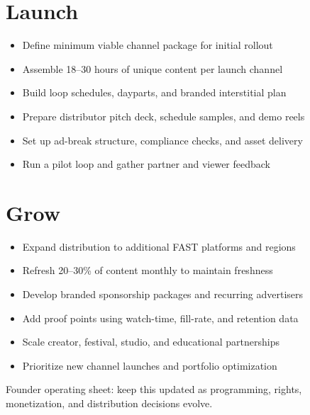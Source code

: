 \documentclass[10pt]{article}
\newcommand{\checkitem}[1]{\item[$\square$] #1}
\begin{document}
\begin{minipage}[t]{0.49\textwidth}
\section*{Launch}
\begin{itemize}
    \checkitem{Define minimum viable channel package for initial rollout}
    \checkitem{Assemble 18--30 hours of unique content per launch channel}
    \checkitem{Build loop schedules, dayparts, and branded interstitial plan}
    \checkitem{Prepare distributor pitch deck, schedule samples, and demo reels}
    \checkitem{Set up ad-break structure, compliance checks, and asset delivery}
    \checkitem{Run a pilot loop and gather partner and viewer feedback}
\end{itemize}

\section*{Grow}
\begin{itemize}
    \checkitem{Expand distribution to additional FAST platforms and regions}
    \checkitem{Refresh 20--30\% of content monthly to maintain freshness}
    \checkitem{Develop branded sponsorship packages and recurring advertisers}
    \checkitem{Add proof points using watch-time, fill-rate, and retention data}
    \checkitem{Scale creator, festival, studio, and educational partnerships}
    \checkitem{Prioritize new channel launches and portfolio optimization}
\end{itemize}
\end{minipage}

\vfill
{\footnotesize Founder operating sheet: keep this updated as programming, rights, monetization, and distribution decisions evolve.}
\end{document}
